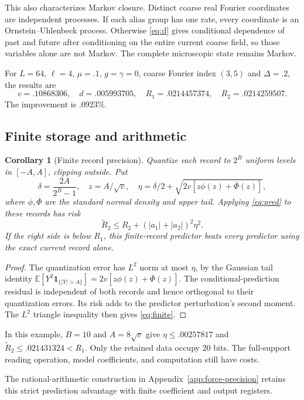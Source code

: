 \documentclass[12pt,a4paper]{article}
\newtheorem{corollary}[theorem]{Corollary}
\newcommand{\E}{\mathbb E}
\begin{document}
This also characterizes Markov closure. Distinct coarse real Fourier
coordinates are independent processes. If each alias group has one
rate, every coordinate is an Ornstein--Uhlenbeck process. Otherwise
\eqref{eq:d} gives conditional dependence of past and future after
conditioning on the entire current coarse field, so those variables
alone are not Markov. The complete microscopic state remains Markov.

For $L=64$, $\ell=4$, $\mu=.1$, $g=\gamma=0$, coarse Fourier index
$(3,5)$ and $\Delta=.2$, the results are
\[
 v=.10868306,\quad d=.005993705,\quad
 R_1=.0214457374,\quad R_2=.0214259507.
\]
The improvement is $.0923\%$.

\subsection{Finite storage and arithmetic}

\begin{corollary}[Finite record precision]\label{cor:finite}
Quantize each record to $2^B$ uniform levels in $[-A,A]$, clipping
outside. Put
\[
 \delta=\frac{2A}{2^B-1},\quad z=A/\sqrt v,\quad
 \eta=\delta/2+\sqrt{2v[z\phi(z)+\overline\Phi(z)]},
\]
where $\phi,\overline\Phi$ are the standard normal density and upper
tail. Applying \eqref{eq:pred} to these records has risk
\begin{equation}
 \widetilde R_2\leq R_2+(|a_1|+|a_2|)^2\eta^2.
 \label{eq:finite}
\end{equation}
If the right side is below $R_1$, this finite-record predictor beats
every predictor using the exact current record alone.
\end{corollary}
\begin{proof}
The quantization error has $L^2$ norm at most $\eta$, by the Gaussian
tail identity
$\E[Y^2\mathbf1_{\{|Y|>A\}}]=2v[z\phi(z)+\overline\Phi(z)]$.
The conditional-prediction residual is independent of both records and
hence orthogonal to their quantization errors. Its risk adds to the
predictor perturbation's second moment. The $L^2$ triangle inequality
then gives \eqref{eq:finite}.
\end{proof}

In this example, $B=10$ and $A=8\sqrt v$ give
$\eta\leq .00257817$ and $\widetilde R_2\leq .021431324<R_1$.
Only the retained data occupy $20$ bits. The full-support reading
operation, model coefficients, and computation still have costs.

The rational-arithmetic construction in Appendix~\ref{app:force-precision}
retains this strict prediction advantage with finite coefficient and
output registers.
\end{document}
